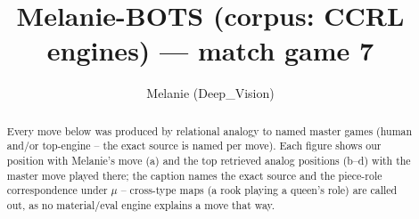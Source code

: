 \documentclass[11pt]{article}
\title{Melanie-BOTS (corpus: CCRL engines) — match game 7}
\author{Melanie (Deep\_Vision)}
\date{}
\begin{document}
\maketitle

\begin{abstract}Every move below was produced by relational analogy to named master games (human and/or top-engine -- the exact source is named per move). Each figure shows our position with Melanie's move (a) and the top retrieved analog positions (b--d) with the master move played there; the caption names the exact source and the piece-role correspondence under $\mu$ -- cross-type maps (a rook playing a queen's role) are called out, as no material/eval engine explains a move that way.\end{abstract}

\begin{figure}[p]\centering
\begin{subfigure}{0.46\textwidth}\centering
\resizebox{\linewidth}{!}{%
\newchessgame
\chessboard[
  setfen={r1bq1rk1/pppp1ppp/3n1b2/8/3P4/8/PPP2PPP/RNBQRBK1 b - - 2 10},
  showmover=false,
  pgfstyle=straightmove, color=movearrow, markmove={f8-e8}
]}
\caption{}
\end{subfigure}\hfill
\begin{subfigure}{0.46\textwidth}\centering
\resizebox{\linewidth}{!}{%
\newchessgame
\chessboard[
  setfen={r1bq1rk1/pppp1ppp/3n1b2/8/3P4/8/PPP2PPP/RNBQRBK1 b - - 2 10},
  showmover=false,
  pgfstyle=straightmove, color=movearrow, markmove={f8-e8}
]}
\caption{}
\end{subfigure}
\\[4pt]
\begin{subfigure}{0.46\textwidth}\centering
\resizebox{\linewidth}{!}{%
\newchessgame
\chessboard[
  setfen={r1bq1rk1/pppp1ppp/3n1b2/8/3P4/8/PPP2PPP/RNBQRBK1 b - - 2 10},
  showmover=false,
  pgfstyle=straightmove, color=movearrow, markmove={f8-e8}
]}
\caption{}
\end{subfigure}\hfill
\begin{subfigure}{0.46\textwidth}\centering
\resizebox{\linewidth}{!}{%
\newchessgame
\chessboard[
  setfen={r1bq1rk1/pppp1ppp/3n1b2/8/3P4/8/PPP2PPP/RNBQRBK1 b - - 2 10},
  showmover=false,
  pgfstyle=straightmove, color=movearrow, markmove={f8-e8}
]}
\caption{}
\end{subfigure}

\end{figure}
\end{document}
